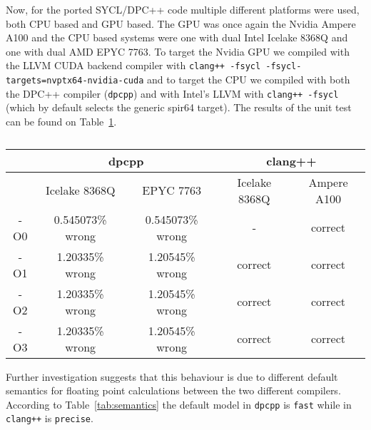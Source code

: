 \documentclass[../main]{subfiles}
\begin{document}
Now, for the ported SYCL/DPC++ code multiple different platforms were used, both CPU based and GPU based.
The GPU was once again the Nvidia Ampere A100 and the CPU based systems were one with dual Intel Icelake 8368Q and one with dual AMD EPYC 7763.
To target the Nvidia GPU we compiled with the LLVM CUDA backend compiler with \texttt{clang++ -fsycl -fsycl-targets=nvptx64-nvidia-cuda} and to target the CPU we compiled with both the DPC++ compiler (\texttt{dpcpp}) and with Intel's LLVM with \texttt{clang++ -fsycl} (which by default selects the generic spir64 target).
The results of the unit test can be found on Table~\ref{tab:correctness}.

\begin{center}
	\begin{table}
		\begin{tabular}{||c c c c c||}
			\hline
			    & \multicolumn{2}{c}{dpcpp} & \multicolumn{2}{c||}{clang++}                               \\ [0.5ex]
			\hline
			    & Icelake 8368Q             & EPYC 7763                     & Icelake 8368Q & Ampere A100 \\ [0.5ex]
			\hline\hline
			-O0 & 0.545073\% wrong          & 0.545073\% wrong              & -             & correct     \\ [0.3ex]
			\hline
			-O1 & 1.20335\% wrong           & 1.20545\% wrong               & correct       & correct     \\ [0.3ex]
			\hline
			-O2 & 1.20335\% wrong           & 1.20545\% wrong               & correct       & correct     \\ [0.3ex]
			\hline
			-O3 & 1.20335\% wrong           & 1.20545\% wrong               & correct       & correct     \\ [0.3ex]
			\hline
		\end{tabular}
		\caption{\label{tab:correctness}}
	\end{table}
\end{center}

Further investigation suggests that this behaviour is due to different default semantics for floating point calculations between the two different compilers.
According to Table~\ref{tab:semantics} the default model in \texttt{dpcpp} is \texttt{fast} while in \texttt{clang++} is \texttt{precise}.
\end{document}
